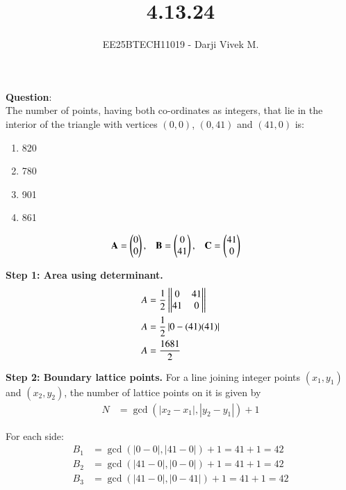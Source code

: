 \documentclass[journal]{IEEEtran}
\begin{document}


\title{4.13.24}
\author{EE25BTECH11019 - Darji Vivek M.}
{\let\newpage\relax\maketitle}

\renewcommand{\thefigure}{\theenumi}
\renewcommand{\thetable}{\theenumi}
\setlength{\intextsep}{10pt}
\renewcommand{\thetable}{\theenumi}

\textbf{Question}:\\
The number of points, having both co-ordinates as integers, that lie in the interior of the triangle with vertices $(0,0)$, $(0,41)$ and $(41,0)$ is:

\begin{multicols}{4}
\begin{enumerate}
    \item 820
    \item 780
    \item 901
    \item 861
\end{enumerate}
\end{multicols}

\solution

\begin{align}
\mathbf{A} &= \begin{pmatrix}0\\0\end{pmatrix}, &
\mathbf{B} &= \begin{pmatrix}0\\41\end{pmatrix}, &
\mathbf{C} &= \begin{pmatrix}41\\0\end{pmatrix}
\end{align}

\textbf{Step 1: Area using determinant.}
\begin{align}
A &= \frac{1}{2}\left|\begin{vmatrix}0 & 41\\41 & 0\end{vmatrix}\right|\\
A &= \frac{1}{2}\left|0 - (41)(41)\right| \\
A &= \frac{1681}{2}
\end{align}

\textbf{Step 2: Boundary lattice points.}
For a line joining integer points $(x_1,y_1)$ and $(x_2,y_2)$,  
the number of lattice points on it is given by
\begin{align}
N &= \gcd(|x_2 - x_1|, |y_2 - y_1|) + 1
\end{align}

For each side:
\begin{align}
B_1 &= \gcd(|0 - 0|, |41 - 0|) + 1 = 41 + 1 = 42 \\
B_2 &= \gcd(|41 - 0|, |0 - 0|) + 1 = 41 + 1 = 42 \\
B_3 &= \gcd(|41 - 0|, |0 - 41|) + 1 = 41 + 1 = 42
\end{align}
\end{document}
